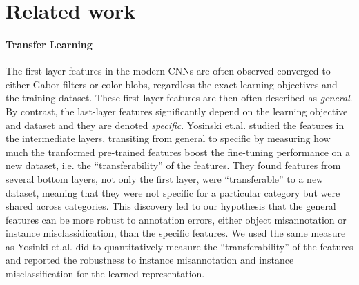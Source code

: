 \section{Related work}
\label{sec:related}

%

\paragraph{Transfer Learning}
The first-layer features in the modern CNNs are often observed converged to either Gabor filters or color blobs, regardless the exact learning objectives and the training dataset.
These first-layer features are then often described as \textit{general}.
By contrast, the last-layer features significantly depend on the learning objective and dataset and they are denoted \textit{specific}.
Yosinski et.al.\cite{yosinski2014transferable} studied the features in the intermediate layers, transiting from general to specific by measuring how much the tranformed  pre-trained features boost the fine-tuning performance on a new dataset, i.e. the ``transferability'' of the features.
They found features from several bottom layers, not only the first layer, were ``transferable'' to a new dataset, meaning that they were not specific for a particular category but were shared across categories.
This discovery led to our hypothesis that the general features can be more robust to annotation errors, either object misannotation or instance misclassidication, than the specific features.
We used the same measure as Yosinki et.al. did to quantitatively measure the ``transferability'' of the features and reported the robustness to instance misannotation and instance misclassification for the learned representation.

